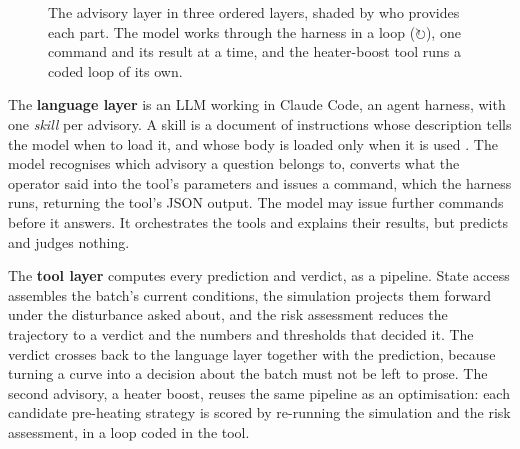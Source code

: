 \begin{figure}[!ht]
{}
    \caption{The advisory layer in three ordered layers, shaded by who provides each part. The
      model works through the harness in a loop ($\circlearrowright$), one command and its result at
      a time, and the heater-boost tool runs a coded loop of its own.}
    \label{fig:architecture}
  \end{figure}

  The \textbf{language layer} is an LLM working in Claude Code, an agent harness, with
  one \emph{skill} per advisory. A skill is a document of instructions whose description tells the model
  when to load it, and whose body is loaded only when it is used \cite{anthropic2026skills}. The
  model recognises which advisory a question belongs to, converts what the operator said into the
  tool's parameters and issues a command, which the harness runs, returning the tool's JSON
  output. The model may issue further commands before it answers. It orchestrates the tools and
  explains their results, but predicts and judges nothing.

  The \textbf{tool layer} computes every prediction and verdict, as a pipeline. State access assembles the
  batch's current conditions, the simulation projects them forward under the disturbance asked
  about, and the risk assessment reduces the trajectory to a verdict and the numbers and thresholds that
  decided it. The verdict crosses back to the language layer together with the prediction, because
  turning a curve into a decision about the batch must not be left to prose. The second advisory, a heater boost, reuses the same pipeline as an optimisation: each
  candidate pre-heating strategy is scored by re-running the simulation and the risk assessment,
  in a loop coded in the tool.

